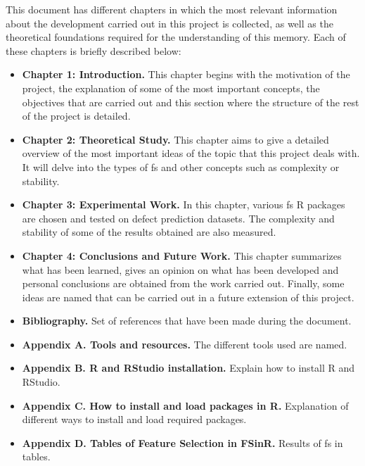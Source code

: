 This document has different chapters in which the most relevant information about the development carried out in this project is collected, as well as the theoretical foundations required for the understanding of this memory. Each of these chapters is briefly described below:
\begin{itemize}
    \item \textbf{Chapter 1: Introduction.} This chapter begins with the motivation of the project, the explanation of some of the most important concepts, the objectives that are carried out and this section where the structure of the rest of the project is detailed.
    
    \item \textbf{Chapter 2: Theoretical Study.} This chapter aims to give a detailed overview of the most important ideas of the topic that this project deals with. It will delve into the types of \acrshort{fs} and other concepts such as complexity or stability.
    
    \item \textbf{Chapter 3: Experimental Work.} In this chapter, various \acrshort{fs} R packages are chosen and tested on defect prediction datasets. The complexity and stability of some of the results obtained are also measured.
    
    \item \textbf{Chapter 4: Conclusions and Future Work.} This chapter summarizes what has been learned, gives an opinion on what has been developed and personal conclusions are obtained from the work carried out. Finally, some ideas are named that can be carried out in a future extension of this project.
    
    \item \textbf{Bibliography.} Set of references that have been made during the document.
    
    \item \textbf{Appendix A. Tools and resources.} The different tools used are named.
    
    \item \textbf{Appendix B. R and RStudio installation.} Explain how to install R and RStudio.
    
    \item \textbf{Appendix C. How to install and load packages in R.} Explanation of different ways to install and load required packages.
    
    \item \textbf{Appendix D. Tables of Feature Selection in FSinR.} Results of \acrlong{fs} in tables.
\end{itemize}